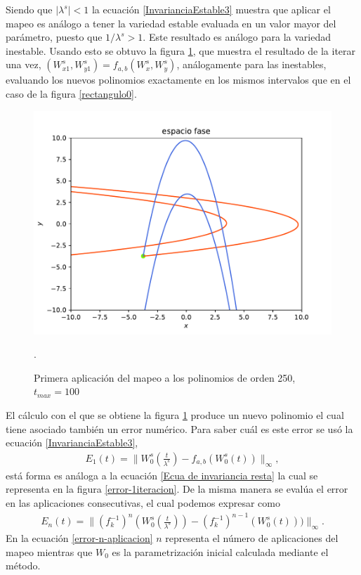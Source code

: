 Siendo que $\vert \lambda^{s} \vert < 1 $ la ecuación \eqref{InvarianciaEstable3} muestra que aplicar el mapeo es análogo a tener la variedad estable evaluada en un valor mayor del parámetro, puesto que $1/\lambda^{s}>1$. Este resultado es análogo para la variedad inestable. Usando esto se obtuvo la figura \ref{Rectangulo1}, que muestra el resultado de la iterar una vez, $(W_{x1}^{s},W_{y1}^{s})=f_{a,b}(W_{x}^{s},W_{y}^{s})$, análogamente para las inestables, evaluando los nuevos polinomios exactamente en los mismos intervalos que en el caso de la figura \ref{rectangulo0}.
\begin{figure}[H]
\centering
\includegraphics[scale=0.6]{rectangulo1}
\caption{Primera aplicación del mapeo a los polinomios de orden 250, $t_{max}=100$}.
\label{Rectangulo1}
\end{figure}
El cálculo con el que se obtiene la figura \ref{Rectangulo1} produce un nuevo polinomio el cual tiene asociado también un error numérico. Para saber cuál es este error se usó la ecuación \eqref{InvarianciaEstable3},
\begin{eqnarray}
E_{1}(t)=\parallel W_{0}^{s}(\frac{t}{\lambda^{s}})-f_{a,b}(W_{0}^{s}(t))\parallel_{\infty},
\label{error-1aplicacion}
\end{eqnarray}
está forma es análoga a la ecuación \eqref{Ecua de invariancia resta} la cual se representa en la figura \ref{error-1iteracion}. De la misma manera se evalúa el error en las aplicaciones consecutivas, el cual podemos expresar como
\begin{eqnarray}
E_{n}(t)=\parallel (f^{-1}_{k})^{n}(W_{0}^{s}(\frac{t}{\lambda^{s}}))- (f^{-1}_{k})^{n-1}(W_{0}^{s}(t)))\parallel_{\infty}.
\label{error-n-aplicacion}
\end{eqnarray}
En la ecuación \eqref{error-n-aplicacion} $n$ representa el número de aplicaciones del mapeo mientras que $W_{0}$ es la parametrización inicial calculada mediante el método.

